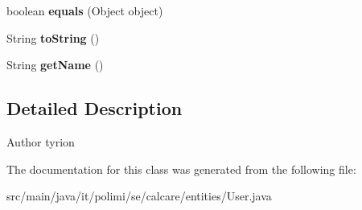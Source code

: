 \begin{DoxyCompactItemize}
\item 
\hypertarget{classit_1_1polimi_1_1se_1_1calcare_1_1entities_1_1User_a8603c798e9a1003f0a2b0c436446ca1d}{}boolean {\bfseries equals} (Object object)\label{classit_1_1polimi_1_1se_1_1calcare_1_1entities_1_1User_a8603c798e9a1003f0a2b0c436446ca1d}

\item 
\hypertarget{classit_1_1polimi_1_1se_1_1calcare_1_1entities_1_1User_a1f6bafd14868c6f966c4c1dacafbeb8c}{}String {\bfseries to\+String} ()\label{classit_1_1polimi_1_1se_1_1calcare_1_1entities_1_1User_a1f6bafd14868c6f966c4c1dacafbeb8c}

\item 
\hypertarget{classit_1_1polimi_1_1se_1_1calcare_1_1entities_1_1User_a8287e3bc4d33047219c300b0a9fd6cc2}{}String {\bfseries get\+Name} ()\label{classit_1_1polimi_1_1se_1_1calcare_1_1entities_1_1User_a8287e3bc4d33047219c300b0a9fd6cc2}

\end{DoxyCompactItemize}


\subsection{Detailed Description}
\begin{DoxyAuthor}{Author}
tyrion 
\end{DoxyAuthor}


The documentation for this class was generated from the following file\+:\begin{DoxyCompactItemize}
\item 
src/main/java/it/polimi/se/calcare/entities/User.\+java\end{DoxyCompactItemize}
